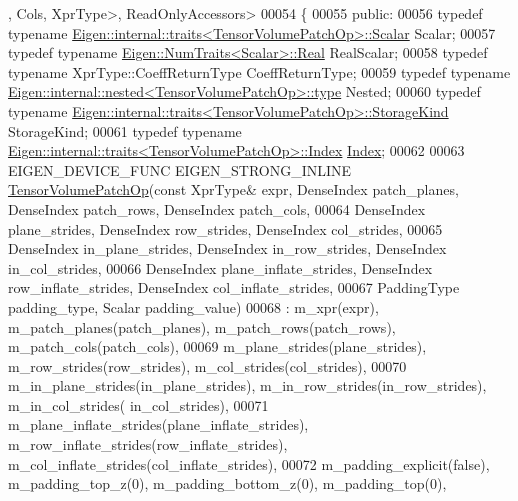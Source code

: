 \begin{DoxyCode}
      , Cols, XprType>, ReadOnlyAccessors>
00054 \{
00055   \textcolor{keyword}{public}:
00056   \textcolor{keyword}{typedef} \textcolor{keyword}{typename} \hyperlink{struct_eigen_1_1internal_1_1traits}{Eigen::internal::traits<TensorVolumePatchOp>::Scalar}
       Scalar;
00057   \textcolor{keyword}{typedef} \textcolor{keyword}{typename} \hyperlink{group___sparse_core___module}{Eigen::NumTraits<Scalar>::Real} RealScalar;
00058   \textcolor{keyword}{typedef} \textcolor{keyword}{typename} XprType::CoeffReturnType CoeffReturnType;
00059   \textcolor{keyword}{typedef} \textcolor{keyword}{typename} \hyperlink{class_eigen_1_1internal_1_1_tensor_lazy_evaluator_writable}{Eigen::internal::nested<TensorVolumePatchOp>::type}
       Nested;
00060   \textcolor{keyword}{typedef} \textcolor{keyword}{typename} \hyperlink{struct_eigen_1_1internal_1_1traits}{Eigen::internal::traits<TensorVolumePatchOp>::StorageKind}
       StorageKind;
00061   \textcolor{keyword}{typedef} \textcolor{keyword}{typename} \hyperlink{struct_eigen_1_1internal_1_1traits}{Eigen::internal::traits<TensorVolumePatchOp>::Index}
       \hyperlink{namespace_eigen_a62e77e0933482dafde8fe197d9a2cfde}{Index};
00062 
00063   EIGEN\_DEVICE\_FUNC EIGEN\_STRONG\_INLINE \hyperlink{class_eigen_1_1_tensor_volume_patch_op}{TensorVolumePatchOp}(\textcolor{keyword}{const} XprType& expr, 
      DenseIndex patch\_planes, DenseIndex patch\_rows, DenseIndex patch\_cols,
00064                                                             DenseIndex plane\_strides, DenseIndex 
      row\_strides, DenseIndex col\_strides,
00065                                                             DenseIndex in\_plane\_strides, DenseIndex 
      in\_row\_strides, DenseIndex in\_col\_strides,
00066                                                             DenseIndex plane\_inflate\_strides, DenseIndex 
      row\_inflate\_strides, DenseIndex col\_inflate\_strides,
00067                                                             PaddingType padding\_type, Scalar padding\_value)
00068       : m\_xpr(expr), m\_patch\_planes(patch\_planes), m\_patch\_rows(patch\_rows), m\_patch\_cols(patch\_cols),
00069         m\_plane\_strides(plane\_strides), m\_row\_strides(row\_strides), m\_col\_strides(col\_strides),
00070         m\_in\_plane\_strides(in\_plane\_strides), m\_in\_row\_strides(in\_row\_strides), m\_in\_col\_strides(
      in\_col\_strides),
00071         m\_plane\_inflate\_strides(plane\_inflate\_strides), m\_row\_inflate\_strides(row\_inflate\_strides), 
      m\_col\_inflate\_strides(col\_inflate\_strides),
00072         m\_padding\_explicit(\textcolor{keyword}{false}), m\_padding\_top\_z(0), m\_padding\_bottom\_z(0), m\_padding\_top(0), 

\end{DoxyCode}
